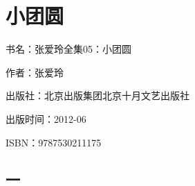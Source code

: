 





\section{小团圆}


\par 书名：张爱玲全集05：小团圆
\par 作者：张爱玲
\par 出版社：北京出版集团北京十月文艺出版社
\par 出版时间：2012-06
\par ISBN：9787530211175




\subsection{一}

